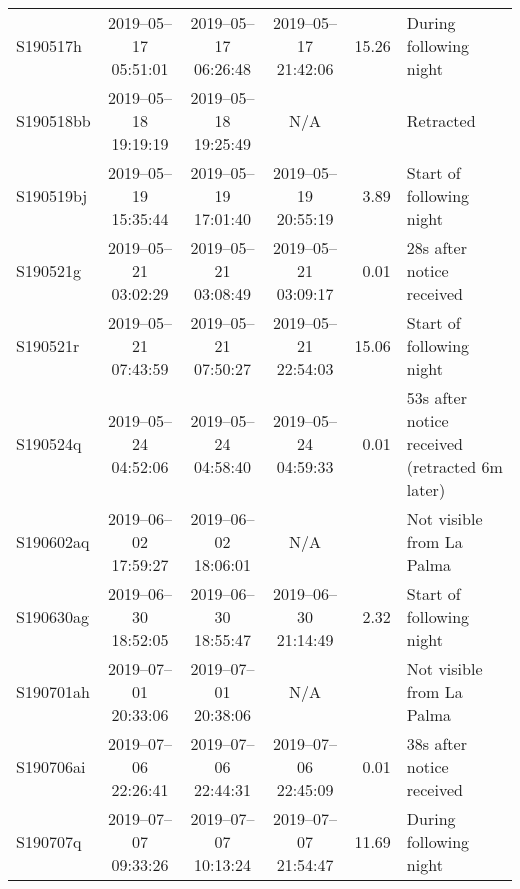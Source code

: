 \begin{colsection}
\begin{colsection}
\begin{sidewaystable}[p]
\begin{footnotesize}
\begin{center}
\begin{tabular}{l|cccrl}
            \\
            S190517h  &
            2019--05--17 05:51:01 &
            2019--05--17 06:26:48 &
            2019--05--17 21:42:06 &
            15.26 &
            During following night
            \\
            S190518bb  &
            2019--05--18 19:19:19 &
            2019--05--18 19:25:49 &
            N/A &
             &
            Retracted
            \\
            S190519bj  &
            2019--05--19 15:35:44 &
            2019--05--19 17:01:40 &
            2019--05--19 20:55:19 &
            3.89 &
            Start of following night
            \\
            S190521g  &
            2019--05--21 03:02:29 &
            2019--05--21 03:08:49 &
            2019--05--21 03:09:17 &
            0.01 &
            28s after notice received
            \\
            S190521r  &
            2019--05--21 07:43:59 &
            2019--05--21 07:50:27 &
            2019--05--21 22:54:03 &
            15.06 &
            Start of following night
            \\
            S190524q  &
            2019--05--24 04:52:06 &
            2019--05--24 04:58:40 &
            2019--05--24 04:59:33 &
            0.01 &
            53s after notice received (retracted 6m later)
            \\
            S190602aq  &
            2019--06--02 17:59:27 &
            2019--06--02 18:06:01 &
            N/A &
             &
            Not visible from La Palma
            \\
            S190630ag  &
            2019--06--30 18:52:05 &
            2019--06--30 18:55:47 &
            2019--06--30 21:14:49 &
            2.32 &
            Start of following night
            \\
            S190701ah  &
            2019--07--01 20:33:06 &
            2019--07--01 20:38:06 &
            N/A &
             &
            Not visible from La Palma
            \\
            S190706ai  &
            2019--07--06 22:26:41 &
            2019--07--06 22:44:31 &
            2019--07--06 22:45:09 &
            0.01 &
            38s after notice received
            \\
            S190707q  &
            2019--07--07 09:33:26 &
            2019--07--07 10:13:24 &
            2019--07--07 21:54:47 &
            11.69 &
            During following night

\end{tabular}
\end{center}
\end{footnotesize}
\end{sidewaystable}
\end{colsection}
\end{colsection}
